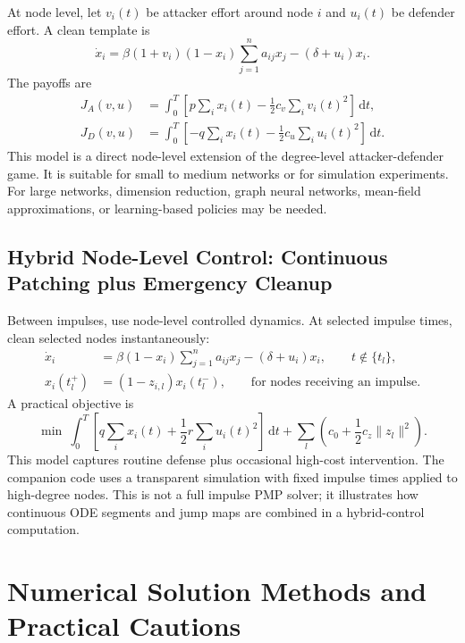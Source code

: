 \documentclass[11pt,a4paper]{article}
\newcommand{\dd}{\,\mathrm{d}}
\begin{document}
At node level, let $v_i(t)$ be attacker effort around node $i$ and $u_i(t)$ be defender effort. A clean template is
\begin{equation}
  \dot{x}_i=\beta(1+v_i)(1-x_i)\sum_{j=1}^n a_{ij}x_j-(\delta+u_i)x_i.
\end{equation}
The payoffs are
\begin{align}
  J_A(v,u)&=\int_0^T\left[p\sum_i x_i(t)-\frac{1}{2}c_v\sum_i v_i(t)^2\right]\dd t,\\
  J_D(v,u)&=\int_0^T\left[-q\sum_i x_i(t)-\frac{1}{2}c_u\sum_i u_i(t)^2\right]\dd t.
\end{align}
This model is a direct node-level extension of the degree-level attacker-defender game. It is suitable for small to medium networks or for simulation experiments. For large networks, dimension reduction, graph neural networks, mean-field approximations, or learning-based policies may be needed.

\subsection{Hybrid Node-Level Control: Continuous Patching plus Emergency Cleanup}

Between impulses, use node-level controlled dynamics. At selected impulse times, clean selected nodes instantaneously:
\begin{align}
  \dot{x}_i&=\beta(1-x_i)\sum_{j=1}^n a_{ij}x_j-(\delta+u_i)x_i,\qquad t\notin\{t_l\},\\
  x_i(t_l^+)&=(1-z_{i,l})x_i(t_l^-),\qquad \text{for nodes receiving an impulse.}
\end{align}
A practical objective is
\begin{equation}
  \min\ \int_0^T\left[q\sum_i x_i(t)+\frac{1}{2}r\sum_i u_i(t)^2\right]\dd t
  +\sum_l\left(c_0+\frac{1}{2}c_z\|z_l\|^2\right).
\end{equation}
This model captures routine defense plus occasional high-cost intervention. The companion code uses a transparent simulation with fixed impulse times applied to high-degree nodes. This is not a full impulse PMP solver; it illustrates how continuous ODE segments and jump maps are combined in a hybrid-control computation.

\section{Numerical Solution Methods and Practical Cautions}
\end{document}
